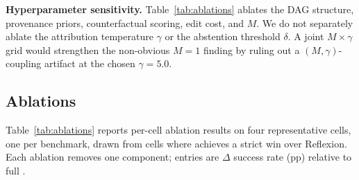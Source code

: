 \textbf{Hyperparameter sensitivity.}
Table~\ref{tab:ablations} ablates the DAG structure, provenance priors,
counterfactual scoring, edit cost, and $M$.  We do not separately ablate
the attribution temperature $\gamma$ or the abstention threshold
$\delta$.  A joint $M \times \gamma$ grid would strengthen the
non-obvious $M{=}1$ finding by ruling out a $(M,\gamma)$-coupling
artifact at the chosen $\gamma{=}5.0$.





\subsection{Ablations}
\label{sec:ablations}

Table~\ref{tab:ablations} reports per-cell ablation results on four
representative cells, one per benchmark, drawn from cells where
\method achieves a strict win over Reflexion.  Each ablation removes
one component; entries are $\Delta$ success rate (pp) relative to full
\method.




